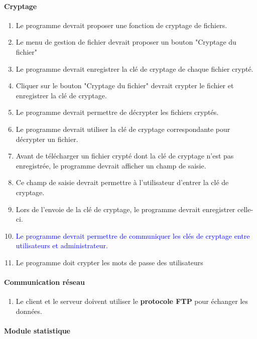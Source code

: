 \documentclass[10pt,a4paper]{report}
\begin{document}
\paragraph{Cryptage}
	\begin{enumerate}
		\item Le programme devrait proposer une fonction de cryptage de fichiers.
		\item Le menu de gestion de fichier devrait proposer un bouton "Cryptage du fichier"
		\item Le programme devrait enregistrer la clé de cryptage de chaque fichier crypté.
		\item Cliquer sur le bouton "Cryptage du fichier" devrait crypter le fichier et enregistrer la clé de cryptage.
		\item Le programme devrait permettre de décrypter les fichiers cryptés.
		\item Le programme devrait utiliser la clé de cryptage correspondante pour décrypter un fichier.
		\item Avant de télécharger un fichier crypté dont la clé de cryptage n'est pas enregistrée, le programme devrait afficher un champ de saisie.
		\item Ce champ de saisie devrait permettre à l'utilisateur d'entrer la clé de cryptage.
		\item Lors de l'envoie de la clé de cryptage, le programme devrait enregistrer celle-ci.
		\item \textcolor{blue}{Le programme devrait permettre de communiquer les clés de cryptage entre utilisateurs et administrateur.}
		\item Le programme doit crypter les mots de passe des utilisateurs
	\end{enumerate}
	
\paragraph{Communication réseau}

	\begin{enumerate}
		\item Le client et le serveur doivent utiliser le \textbf{protocole FTP} pour échanger les données.
	\end{enumerate}
	
\paragraph{Module statistique }
\end{document}
